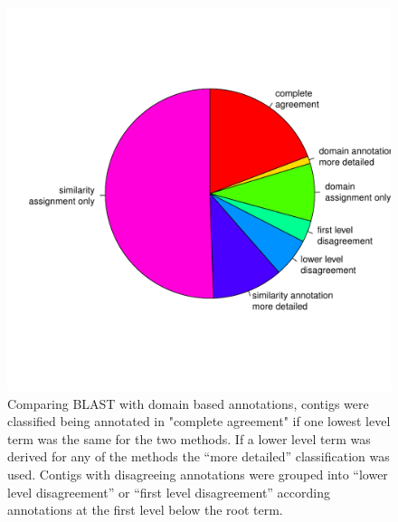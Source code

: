 \documentclass[12pt,a4paper]{article}
\begin{document}
\begin{figure}
  \centering
\includegraphics{GO_pie.pdf}
\caption[Agreement of GO-annotation]{Comparing BLAST with domain based
  annotations, contigs were classified being annotated in "complete
  agreement" if one lowest level term was the same for the two
  methods. If a lower level term was derived for any of the methods
  the ``more detailed'' classification was used. Contigs with
  disagreeing annotations were grouped into ``lower level
  disagreement'' or ``first level disagreement'' according annotations
  at the first level below the root term.}
\end{figure}






\newpage
\end{document}
